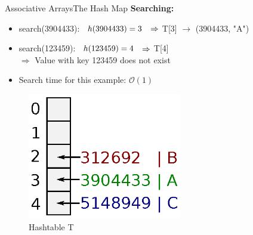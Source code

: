\begin{frame}{Associative Arrays}{The Hash Map}
  \textbf{Searching:}
  \small
  \begin{itemize}
     \setlength\itemsep{0.75em}
    \item<1->
    search(3904433):
      $\hspace*{0.5em} h(3904433) = 3$
      $\hspace*{0.5em} \Rightarrow$
      T[3] $\rightarrow$ {\color{inkscapeGreen}(3904433, "A")}
    \item<2->
      search(123459):
      $\hspace*{0.5em} h(123459) = 4$
      $\hspace*{0.5em} \Rightarrow$
      T[4] {}\\
      \vspace{0.75em}
      $\Rightarrow$ {\color{red}Value with key 123459 does not exist}
    \item<3->
      Search time for this example: {\color{Mittel-Blau}$\mathcal{O}(1)$}
  \end{itemize}
  \vspace*{-1.0em}
  \begin{figure}
    \caption{Hashtable T}
    \centering
    \includegraphics[width=0.6\textwidth]{Images/Bucket4.eps}
  \end{figure}
\end{frame}


